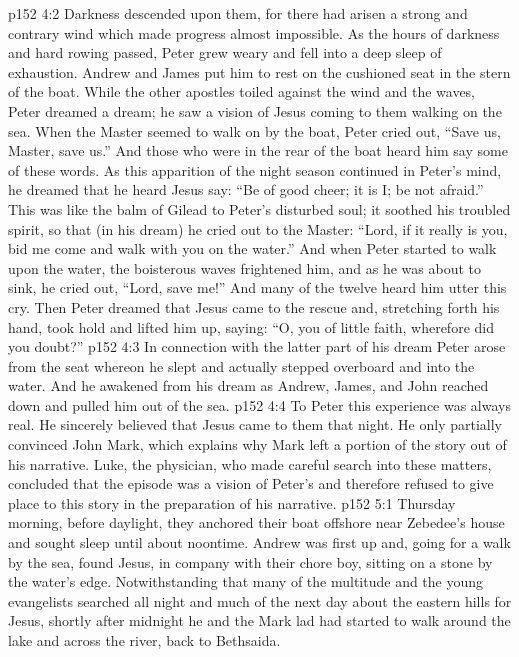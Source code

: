\vs p152 4:2 Darkness descended upon them, for there had arisen a strong and contrary wind which made progress almost impossible. As the hours of darkness and hard rowing passed, Peter grew weary and fell into a deep sleep of exhaustion. Andrew and James put him to rest on the cushioned seat in the stern of the boat. While the other apostles toiled against the wind and the waves, Peter dreamed a dream; he saw a vision of Jesus coming to them walking on the sea. When the Master seemed to walk on by the boat, Peter cried out, “Save us, Master, save us.” And those who were in the rear of the boat heard him say some of these words. As this apparition of the night season continued in Peter’s mind, he dreamed that he heard Jesus say: “Be of good cheer; it is I; be not afraid.” This was like the balm of Gilead to Peter’s disturbed soul; it soothed his troubled spirit, so that (in his dream) he cried out to the Master: “Lord, if it really is you, bid me come and walk with you on the water.” And when Peter started to walk upon the water, the boisterous waves frightened him, and as he was about to sink, he cried out, “Lord, save me!” And many of the twelve heard him utter this cry. Then Peter dreamed that Jesus came to the rescue and, stretching forth his hand, took hold and lifted him up, saying: “O, you of little faith, wherefore did you doubt?”
\vs p152 4:3 In connection with the latter part of his dream Peter arose from the seat whereon he slept and actually stepped overboard and into the water. And he awakened from his dream as Andrew, James, and John reached down and pulled him out of the sea.
\vs p152 4:4 To Peter this experience was always real. He sincerely believed that Jesus came to them that night. He only partially convinced John Mark, which explains why Mark left a portion of the story out of his narrative. Luke, the physician, who made careful search into these matters, concluded that the episode was a vision of Peter’s and therefore refused to give place to this story in the preparation of his narrative.
\vs p152 5:1 Thursday morning, before daylight, they anchored their boat offshore near Zebedee’s house and sought sleep until about noontime. Andrew was first up and, going for a walk by the sea, found Jesus, in company with their chore boy, sitting on a stone by the water’s edge. Notwithstanding that many of the multitude and the young evangelists searched all night and much of the next day about the eastern hills for Jesus, shortly after midnight he and the Mark lad had started to walk around the lake and across the river, back to Bethsaida.
